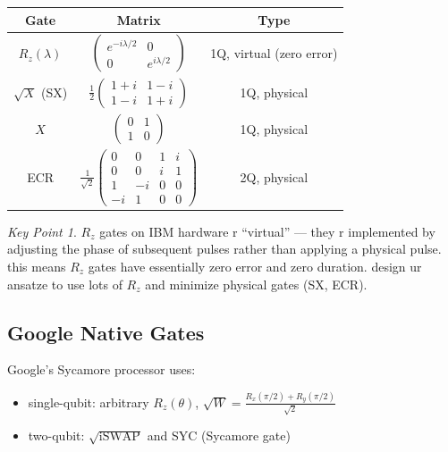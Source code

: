 \documentclass[11pt,a4paper]{article}
\theoremstyle{definition}
\theoremstyle{remark}
\newtheorem*{keypoint}{Key Point}
\begin{document}
\begin{center}
\renewcommand{\arraystretch}{1.4}
\begin{tabular}{|c|c|c|}
\hline
\textbf{Gate} & \textbf{Matrix} & \textbf{Type} \\
\hline
$R_z(\lambda)$ & $\begin{pmatrix} e^{-i\lambda/2} & 0 \\ 0 & e^{i\lambda/2} \end{pmatrix}$ & 1Q, virtual (zero error) \\
\hline
$\sqrt{X}$ (SX) & $\frac{1}{2}\begin{pmatrix} 1+i & 1-i \\ 1-i & 1+i \end{pmatrix}$ & 1Q, physical \\
\hline
$X$ & $\begin{pmatrix} 0 & 1 \\ 1 & 0 \end{pmatrix}$ & 1Q, physical \\
\hline
ECR & $\frac{1}{\sqrt{2}}\begin{pmatrix} 0 & 0 & 1 & i \\ 0 & 0 & i & 1 \\ 1 & -i & 0 & 0 \\ -i & 1 & 0 & 0 \end{pmatrix}$ & 2Q, physical \\
\hline
\end{tabular}
\end{center}

\begin{keypoint}
$R_z$ gates on IBM hardware r ``virtual'' --- they r implemented by adjusting the phase of subsequent pulses rather than applying a physical pulse. this means $R_z$ gates have essentially zero error and zero duration. design ur ansatze to use lots of $R_z$ and minimize physical gates (SX, ECR).
\end{keypoint}

\subsection{Google Native Gates}

Google's Sycamore processor uses:
\begin{itemize}[leftmargin=*]
    \item single-qubit: arbitrary $R_z(\theta)$, $\sqrt{W} = \frac{R_x(\pi/2) + R_y(\pi/2)}{\sqrt{2}}$
    \item two-qubit: $\sqrt{\text{iSWAP}}$ and SYC (Sycamore gate)
\end{itemize}
\end{document}
